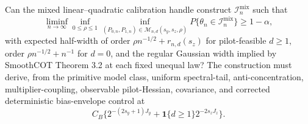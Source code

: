 Can the mixed linear--quadratic calibration handle construct \(\mathcal I_n^{\mathrm{mix}}\) such that
\[
\liminf_{n\to\infty}\inf_{0\le\rho\le1}\inf_{(P_{0,n},P_{1,n})\in\mathcal M_{n,d}(s_y,s_z,\rho)}P\{\theta_n\in\mathcal I_n^{\mathrm{mix}}\}\ge1-\alpha,
\]
with expected half-width of order \(\rho n^{-1/2}+r_{n,d}(s_z)\) for pilot-feasible \(d\ge1\), order \(\rho n^{-1/2}+n^{-1}\) for \(d=0\), and the regular Gaussian width implied by SmoothCOT Theorem 3.2 at each fixed unequal law? The construction must derive, from the primitive model class, uniform spectral-tail, anti-concentration, multiplier-coupling, observable pilot-Hessian, covariance, and corrected deterministic bias-envelope control at
\[
C_B\{2^{-(2s_y+1)J_y}+\mathbf 1\{d\ge1\}2^{-2s_zJ_z}\}.
\]